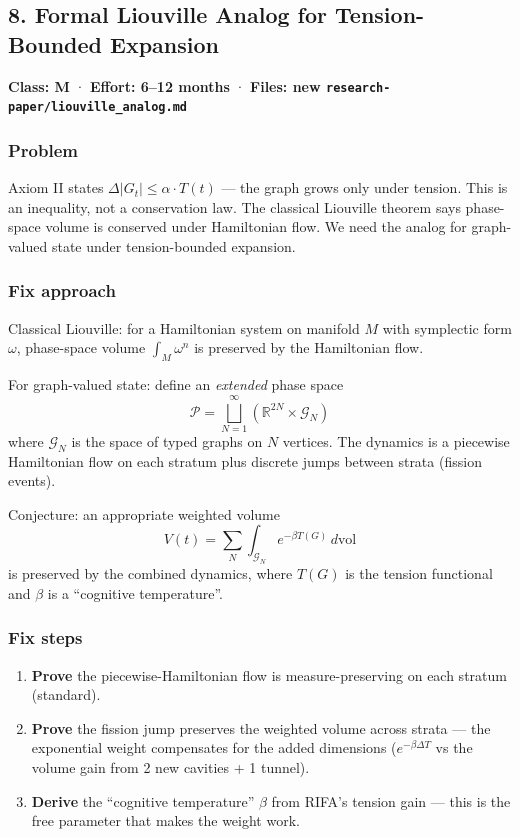 \documentclass[
  11pt,
  a4paper,
]{article}
\providecommand{\tightlist}{%
  \setlength{\itemsep}{0pt}\setlength{\parskip}{0pt}}
\begin{document}
\subsection{8. Formal Liouville Analog for Tension-Bounded
Expansion}\label{formal-liouville-analog-for-tension-bounded-expansion}

\textbf{Class: M} · \textbf{Effort: 6--12 months} · \textbf{Files: new
\texttt{research-paper/liouville\_analog.md}}

\subsubsection{Problem}\label{problem-7}

Axiom II states \(\Delta|G_t| \leq \alpha \cdot T(t)\) --- the graph
grows only under tension. This is an inequality, not a conservation law.
The classical Liouville theorem says phase-space volume is conserved
under Hamiltonian flow. We need the analog for graph-valued state under
tension-bounded expansion.

\subsubsection{Fix approach}\label{fix-approach}

Classical Liouville: for a Hamiltonian system on manifold \(M\) with
symplectic form \(\omega\), phase-space volume \(\int_M \omega^n\) is
preserved by the Hamiltonian flow.

For graph-valued state: define an \emph{extended} phase space \[
\mathcal{P} = \bigsqcup_{N=1}^{\infty} \left(\mathbb{R}^{2N} \times \mathcal{G}_N\right)
\] where \(\mathcal{G}_N\) is the space of typed graphs on \(N\)
vertices. The dynamics is a piecewise Hamiltonian flow on each stratum
plus discrete jumps between strata (fission events).

Conjecture: an appropriate weighted volume \[
V(t) = \sum_N \int_{\mathcal{G}_N} e^{-\beta T(G)} \, d\text{vol}
\] is preserved by the combined dynamics, where \(T(G)\) is the tension
functional and \(\beta\) is a ``cognitive temperature''.

\subsubsection{Fix steps}\label{fix-steps}

\begin{enumerate}
\def\labelenumi{\arabic{enumi}.}
\tightlist
\item
  \textbf{Prove} the piecewise-Hamiltonian flow is measure-preserving on
  each stratum (standard).
\item
  \textbf{Prove} the fission jump preserves the weighted volume across
  strata --- the exponential weight compensates for the added dimensions
  (\(e^{-\beta \Delta T}\) vs the volume gain from 2 new cavities + 1
  tunnel).
\item
  \textbf{Derive} the ``cognitive temperature'' \(\beta\) from RIFA's
  tension gain --- this is the free parameter that makes the weight
  work.
\end{enumerate}
\end{document}
